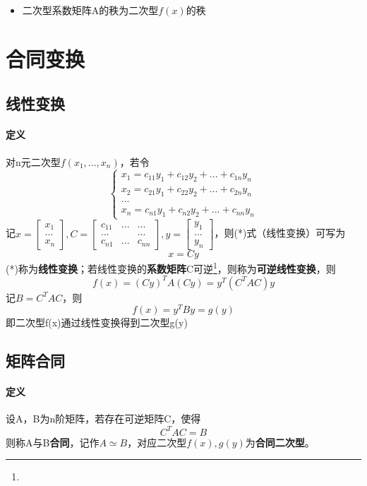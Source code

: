 \begin{itemize}
    \item 二次型系数矩阵A的秩为二次型\(f(x)\)的秩
\end{itemize}


\section{合同变换}

\subsection{线性变换}

\paragraph{定义}
对n元二次型\(f(x_1, ..., x_n)\)，若令
\[\begin{cases}
    x_1 = c_{11}y_1 + c_{12}y_2 + ... + c_{1n}y_n \\ 
    x_2 = c_{21}y_1 + c_{22}y_2 + ... + c_{2n}y_n \\ 
    ... \\ 
    x_n = c_{n1}y_1 + c_{n2}y_2 + ... + c_{nn}y_n
\end{cases}\tag{*}\]
记\(x = \begin{bmatrix}
    x_1 \\ 
    ... \\ 
    x_n
\end{bmatrix}, C = \begin{bmatrix}
    c_{11} & ... & ... \\ 
    ... & & ... \\ 
    c_{n1} & ... & c_{nn}
\end{bmatrix}, y = \begin{bmatrix}
    y_1 \\ 
    ... \\ 
    y_n
\end{bmatrix}\)，则(*)式（线性变换）可写为\[x = Cy\]
(*)称为\textbf{线性变换}；若线性变换的\textbf{系数矩阵}C可逆\footnote{\mymatrix}，则称为\textbf{可逆线性变换}，则\[f(x) = (Cy)^TA(Cy) = y^T(C^TAC)y\]
记\(B = C^TAC\)，则\[f(x) = y^TBy = g(y)\]
即二次型f(x)通过线性变换得到二次型g(y)


\subsection{矩阵合同}

\paragraph{定义}
设A，B为n阶矩阵，若存在可逆矩阵C，使得\[C^TAC = B\]
则称A与B\textbf{合同}，记作\(A \simeq B\)，对应二次型\(f(x), g(y)\)为\textbf{合同二次型}。

